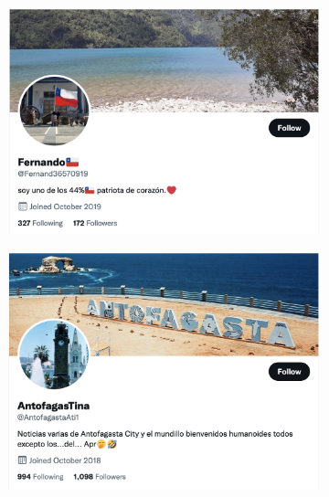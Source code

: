     
    \clearpage
    \begin{figure}[H]
        \caption{Random Author Location and Descriptions after Step 3}
        \label{random_loc_desc}
        
        \centering
            \begin{subfigure}{0.49\textwidth}
                \centering
                \includegraphics[width=.99\linewidth]{figs/chile_author_1.png}
            \end{subfigure}%
            \begin{subfigure}{0.49\textwidth}
                \centering
                \includegraphics[width=.99\linewidth]{figs/chile_author_2.png}
            \end{subfigure}

\end{figure}
